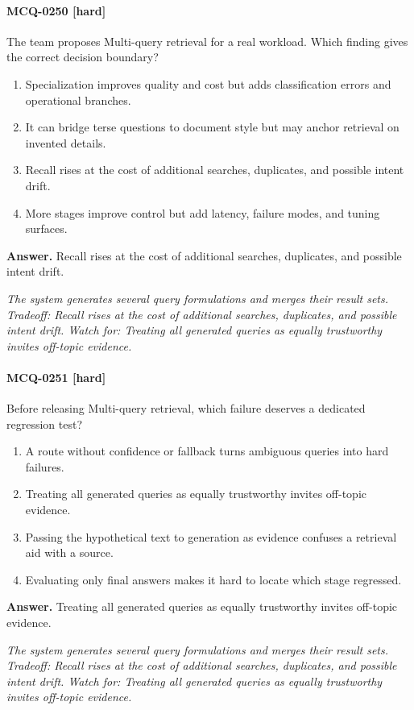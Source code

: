 \paragraph{MCQ-0250 [hard]} The team proposes Multi-query retrieval for a real workload. Which finding gives the correct decision boundary?
\begin{enumerate}[label=\Alph*.]
\item Specialization improves quality and cost but adds classification errors and operational branches.
\item It can bridge terse questions to document style but may anchor retrieval on invented details.
\item Recall rises at the cost of additional searches, duplicates, and possible intent drift.
\item More stages improve control but add latency, failure modes, and tuning surfaces.
\end{enumerate}
\noindent\textbf{Answer.} Recall rises at the cost of additional searches, duplicates, and possible intent drift.
\par\textit{The system generates several query formulations and merges their result sets. Tradeoff: Recall rises at the cost of additional searches, duplicates, and possible intent drift. Watch for: Treating all generated queries as equally trustworthy invites off-topic evidence.}
\paragraph{MCQ-0251 [hard]} Before releasing Multi-query retrieval, which failure deserves a dedicated regression test?
\begin{enumerate}[label=\Alph*.]
\item A route without confidence or fallback turns ambiguous queries into hard failures.
\item Treating all generated queries as equally trustworthy invites off-topic evidence.
\item Passing the hypothetical text to generation as evidence confuses a retrieval aid with a source.
\item Evaluating only final answers makes it hard to locate which stage regressed.
\end{enumerate}
\noindent\textbf{Answer.} Treating all generated queries as equally trustworthy invites off-topic evidence.
\par\textit{The system generates several query formulations and merges their result sets. Tradeoff: Recall rises at the cost of additional searches, duplicates, and possible intent drift. Watch for: Treating all generated queries as equally trustworthy invites off-topic evidence.}
